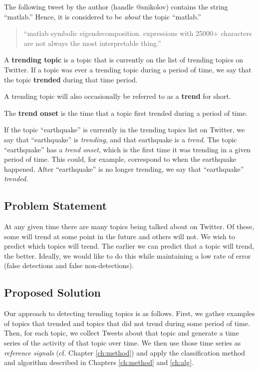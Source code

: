 \begin{example}
The following tweet by the author (handle @snikolov) contains the string
``matlab.'' Hence, it is considered to be {\em about} the topic ``matlab.''
\begin{quote}
``matlab symbolic eigendecomposition. expressions with 25000+ characters are not
always the most interpretable thing.''
\end{quote}
\end{example} 

\begin{defn}
A {\bf trending topic} is a topic that is currently on the list of trending
topics on Twitter. If a topic was ever a trending topic during a period of time,
we say that the topic {\bf trended} during that time period.
\end{defn}

\begin{defn}[Trend] A trending topic will also occasionally be referred to as a {\bf trend}
  for short.
\end{defn}

\begin{defn}
  The {\bf trend onset} is the time that a topic first trended during a
  period of time.
\end{defn}

\begin{example}
If the topic ``earthquake'' is currently in the trending topics list on Twitter,
we say that ``earthquake'' is {\em trending}, and that earthquake is a {\em
  trend}. The topic ``earthquake'' has a {\em trend onset}, which is the first
time it was trending in a given period of time. This could, for example,
correspond to when the earthquake happened. After ``earthquake'' is no longer
trending, we say that ``earthquake'' {\em trended}.
\end{example}

\subsection{Problem Statement}
At any given time there are many topics being talked about on Twitter. Of these,
some will trend at some point in the future and others will not. We wish to
predict which topics will trend. The earlier we can predict that a topic will
trend, the better. Ideally, we would like to do this while maintaining a low
rate of error (false detections and false non-detections).

\subsection{Proposed Solution}
Our approach to detecting trending topics is as follows. First, we gather
examples of topics that trended and topics that did not trend during
some period of time. Then, for each topic, we collect Tweets about that topic
and generate a time series of the activity of that topic over time. We then use
those time series as {\em reference signals} (cf. Chapter \ref{ch:method}) and
apply the classification method and algorithm described in Chapters
\ref{ch:method} and \ref{ch:alg}.

